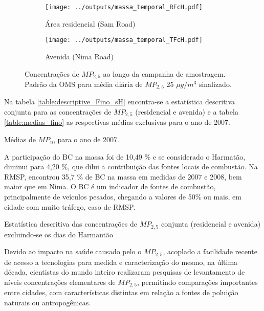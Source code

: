 \begin{figure}[H]
  \centering
  \begin{subfigure}[b]{0.45\textwidth}
    \texttt{[image: ../outputs/massa\_temporal\_RFcH.pdf]}
    \caption{Área residencial (Sam Road)}
  \end{subfigure}%
  \begin{subfigure}[b]{0.45\textwidth}
    \texttt{[image: ../outputs/massa\_temporal\_TFcH.pdf]}
    \caption{Avenida (Nima Road)}
  \end{subfigure}
  \caption{Concentrações de $MP_{2,5}$ ao longo da campanha de amostragem. 
           Padrão da OMS para média diária de $MP_{2,5}$ 25 $\mu g/m^3$ sinalizado.
           \label{fig:massa_temporal_mp2.5}}
\end{figure}

Na tabela \ref{table:descriptive_Fino_sH} encontra-se a estatística 
descritiva conjunta para as concentrações de $MP_{2,5}$ (residencial e avenida)
e a tabela \ref{table:medias_fino} as respectivas médias exclusivas para o ano
de 2007.

\begin{table}[H]
  \centering
  
  \caption{Médias de $MP_{10}$ para o ano de 2007. \label{table:medias_fino}}
\end{table} 

A participação do BC na massa foi de 10,49 \% e se considerado 
o Harmatão, diminui para 4,20 \%, que dilui a contribuição das fontes locais 
de combustão.
Na RMSP, \citet{andrade2012} encontrou 35,7 \% de BC na massa em medidas
de 2007 e 2008, bem maior que em Nima. O BC é um indicador de fontes de 
combustão, principalmente de veículos pesados, chegando a valores de 50\% ou 
mais, em cidade com muito tráfego, caso de RMSP.

\begin{table}[H]
  \centering
    
  \caption{Estatística descritiva das concentrações de $MP_{2,5}$ conjunta 
           (residencial e avenida) excluindo-se os dias do Harmantão
            \label{table:descriptive_Fino_sH}}
\end{table}

Devido ao impacto na saúde causado pelo o $MP_{2,5}$, acoplado a facilidade 
recente de acesso a tecnologias para medida e caracterização do mesmo, 
na última década, cientistas do mundo inteiro realizaram pesquisas de 
levantamento de níveis concentrações elementares de $MP_{2,5}$, permitindo
comparações importantes entre cidades, com características distintas em 
relação a fontes de poluição naturais ou antropogênicas.


